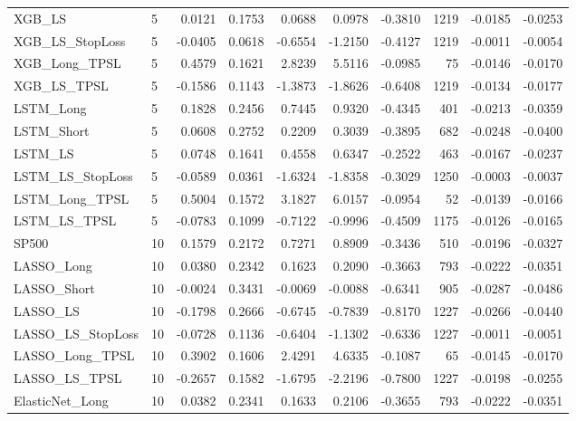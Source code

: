 \begin{tabular}{llrrrrrrrr}
\cline{1-10}
XGB\_LS & 5 & 0.0121 & 0.1753 & 0.0688 & 0.0978 & -0.3810 & 1219 & -0.0185 & -0.0253 \\
\cline{1-10}
XGB\_LS\_StopLoss & 5 & -0.0405 & 0.0618 & -0.6554 & -1.2150 & -0.4127 & 1219 & -0.0011 & -0.0054 \\
\cline{1-10}
XGB\_Long\_TPSL & 5 & 0.4579 & 0.1621 & 2.8239 & 5.5116 & -0.0985 & 75 & -0.0146 & -0.0170 \\
\cline{1-10}
XGB\_LS\_TPSL & 5 & -0.1586 & 0.1143 & -1.3873 & -1.8626 & -0.6408 & 1219 & -0.0134 & -0.0177 \\
\cline{1-10}
LSTM\_Long & 5 & 0.1828 & 0.2456 & 0.7445 & 0.9320 & -0.4345 & 401 & -0.0213 & -0.0359 \\
\cline{1-10}
LSTM\_Short & 5 & 0.0608 & 0.2752 & 0.2209 & 0.3039 & -0.3895 & 682 & -0.0248 & -0.0400 \\
\cline{1-10}
LSTM\_LS & 5 & 0.0748 & 0.1641 & 0.4558 & 0.6347 & -0.2522 & 463 & -0.0167 & -0.0237 \\
\cline{1-10}
LSTM\_LS\_StopLoss & 5 & -0.0589 & 0.0361 & -1.6324 & -1.8358 & -0.3029 & 1250 & -0.0003 & -0.0037 \\
\cline{1-10}
LSTM\_Long\_TPSL & 5 & 0.5004 & 0.1572 & 3.1827 & 6.0157 & -0.0954 & 52 & -0.0139 & -0.0166 \\
\cline{1-10}
LSTM\_LS\_TPSL & 5 & -0.0783 & 0.1099 & -0.7122 & -0.9996 & -0.4509 & 1175 & -0.0126 & -0.0165 \\
\cline{1-10}
SP500 & 10 & 0.1579 & 0.2172 & 0.7271 & 0.8909 & -0.3436 & 510 & -0.0196 & -0.0327 \\
\cline{1-10}
LASSO\_Long & 10 & 0.0380 & 0.2342 & 0.1623 & 0.2090 & -0.3663 & 793 & -0.0222 & -0.0351 \\
\cline{1-10}
LASSO\_Short & 10 & -0.0024 & 0.3431 & -0.0069 & -0.0088 & -0.6341 & 905 & -0.0287 & -0.0486 \\
\cline{1-10}
LASSO\_LS & 10 & -0.1798 & 0.2666 & -0.6745 & -0.7839 & -0.8170 & 1227 & -0.0266 & -0.0440 \\
\cline{1-10}
LASSO\_LS\_StopLoss & 10 & -0.0728 & 0.1136 & -0.6404 & -1.1302 & -0.6336 & 1227 & -0.0011 & -0.0051 \\
\cline{1-10}
LASSO\_Long\_TPSL & 10 & 0.3902 & 0.1606 & 2.4291 & 4.6335 & -0.1087 & 65 & -0.0145 & -0.0170 \\
\cline{1-10}
LASSO\_LS\_TPSL & 10 & -0.2657 & 0.1582 & -1.6795 & -2.2196 & -0.7800 & 1227 & -0.0198 & -0.0255 \\
\cline{1-10}
ElasticNet\_Long & 10 & 0.0382 & 0.2341 & 0.1633 & 0.2106 & -0.3655 & 793 & -0.0222 & -0.0351 \\

\end{tabular}

